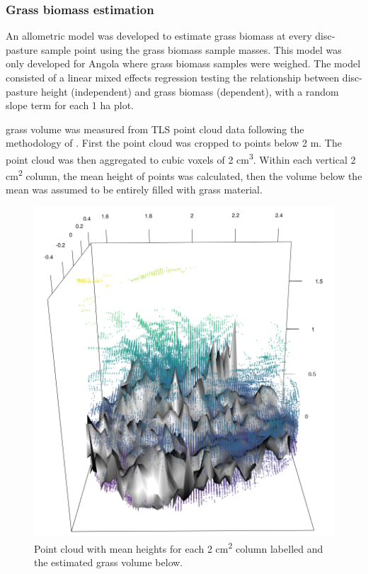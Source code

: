 \documentclass[11pt,a4paper]{article}
\begin{document}
\subsubsection{Grass biomass estimation}

An allometric model was developed to estimate grass biomass at every disc-pasture sample point using the grass biomass sample masses. This model was only developed for Angola where grass biomass samples were weighed. The model consisted of a linear mixed effects regression testing the relationship between disc-pasture height (independent) and grass biomass (dependent), with a random slope term for each 1 ha plot. 

grass volume was measured from TLS point cloud data following the methodology of \citet{}. First the point cloud was cropped to points below 2 m. The point cloud was then aggregated to cubic voxels of 2 cm\textsuperscript{3}. Within each vertical 2 cm\textsuperscript{2} column, the mean height of points was calculated, then the volume below the mean was assumed to be entirely filled with grass material.

\begin{figure}[H]
\centering
	\includegraphics[width=\textwidth]{grass_3d}
	\caption{Point cloud with mean heights for each 2 cm\textsuperscript{2} column labelled and the estimated grass volume below.}
	\label{grass_3d}
\end{figure}
\end{document}
